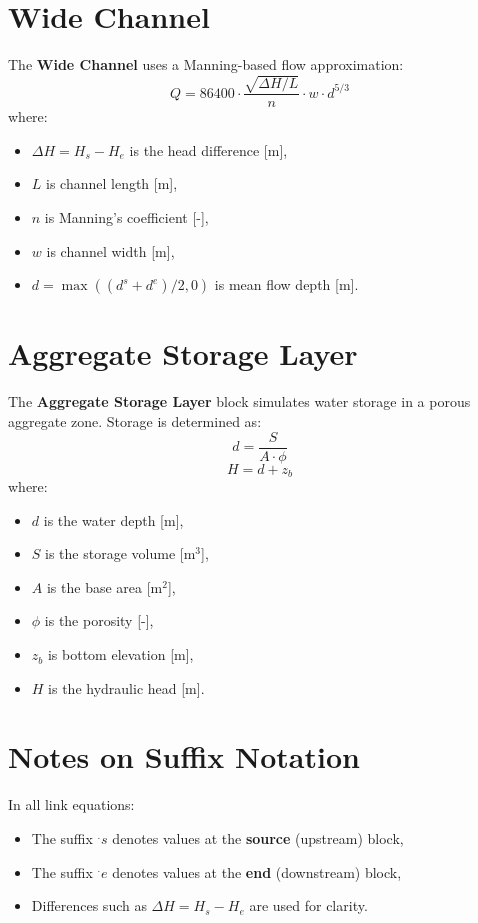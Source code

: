 \documentclass[12pt]{report}
\begin{document}
\section{Wide Channel}

The \textbf{Wide Channel} uses a Manning-based flow approximation:
\begin{equation}
Q = 86400 \cdot \frac{\sqrt{\Delta H/L}}{n} \cdot w \cdot d^{5/3}
\end{equation}
where:
\begin{itemize}
\item $\Delta H = H_s - H_e$ is the head difference [m],
\item $L$ is channel length [m],
\item $n$ is Manning’s coefficient [-],
\item $w$ is channel width [m],
\item $d = \max((d^s + d^e)/2, 0)$ is mean flow depth [m].
\end{itemize}

\section{Aggregate Storage Layer}

The \textbf{Aggregate Storage Layer} block simulates water storage in a porous aggregate zone. Storage is determined as:
\begin{equation}
d = \frac{S}{A \cdot \phi}
\end{equation}
\begin{equation}
H = d + z_b
\end{equation}
where:
\begin{itemize}
\item $d$ is the water depth [m],
\item $S$ is the storage volume [m$^3$],
\item $A$ is the base area [m$^2$],
\item $\phi$ is the porosity [-],
\item $z_b$ is bottom elevation [m],
\item $H$ is the hydraulic head [m].
\end{itemize}

\section{Notes on Suffix Notation}

In all link equations:
\begin{itemize}
\item The suffix $^.s$ denotes values at the \textbf{source} (upstream) block,
\item The suffix $^.e$ denotes values at the \textbf{end} (downstream) block,
\item Differences such as $\Delta H = H_s - H_e$ are used for clarity.
\end{itemize}
\end{document}
